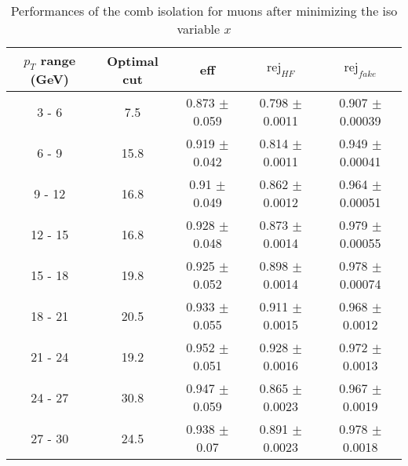 \begin{table}[htbp]
   \centering
   \begin{tabular}{|c|c|c|c|c|}
      \hline
      $p_T$ range (GeV) & Optimal cut & eff & $\textrm{rej}_{HF}$ & $\textrm{rej}_{fake}$ \\
      \hline
      3 - 6 & 7.5 & 0.873 $\pm$ 0.059 & 0.798 $\pm$ 0.0011 & 0.907 $\pm$ 0.00039 \\
      \hline
      6 - 9 & 15.8 & 0.919 $\pm$ 0.042 & 0.814 $\pm$ 0.0011 & 0.949 $\pm$ 0.00041 \\
      \hline
      9 - 12 & 16.8 & 0.91 $\pm$ 0.049 & 0.862 $\pm$ 0.0012 & 0.964 $\pm$ 0.00051 \\
      \hline
      12 - 15 & 16.8 & 0.928 $\pm$ 0.048 & 0.873 $\pm$ 0.0014 & 0.979 $\pm$ 0.00055 \\
      \hline
      15 - 18 & 19.8 & 0.925 $\pm$ 0.052 & 0.898 $\pm$ 0.0014 & 0.978 $\pm$ 0.00074 \\
      \hline
      18 - 21 & 20.5 & 0.933 $\pm$ 0.055 & 0.911 $\pm$ 0.0015 & 0.968 $\pm$ 0.0012 \\
      \hline
      21 - 24 & 19.2 & 0.952 $\pm$ 0.051 & 0.928 $\pm$ 0.0016 & 0.972 $\pm$ 0.0013 \\
      \hline
      24 - 27 & 30.8 & 0.947 $\pm$ 0.059 & 0.865 $\pm$ 0.0023 & 0.967 $\pm$ 0.0019 \\
      \hline
      27 - 30 & 24.5 & 0.938 $\pm$ 0.07 & 0.891 $\pm$ 0.0023 & 0.978 $\pm$ 0.0018 \\
      \hline
   \end{tabular}
   \caption{\small{Performances of the comb isolation for muons after minimizing the iso variable $x$}\label{tab:comb_muon_opt}}
\end{table}







